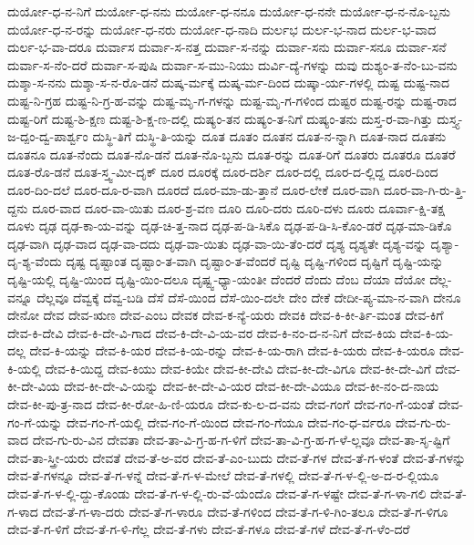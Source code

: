 {ದುರ್ಯೋ-ಧ-ನ-ನಿಗೆ
ದುರ್ಯೋ-ಧ-ನನು
ದುರ್ಯೋ-ಧ-ನನೂ
ದುರ್ಯೋ-ಧ-ನನೇ
ದುರ್ಯೋ-ಧ-ನ-ನೊ-ಬ್ಬನು
ದುರ್ಯೋ-ಧ-ನ-ರನ್ನು
ದುರ್ಯೋ-ಧ-ನರು
ದುರ್ಯೋ-ಧ-ನಾದಿ
ದುರ್ಲಭ
ದುರ್ಲ-ಭ-ನಾದ
ದುರ್ಲ-ಭ-ವಾದ
ದುರ್ಲ-ಭ-ವಾ-ದರೂ
ದುರ್ವಾಸ
ದುರ್ವಾ-ಸ-ನತ್ತ
ದುರ್ವಾ-ಸ-ನನ್ನು
ದುರ್ವಾ-ಸನು
ದುರ್ವಾ-ಸನೂ
ದುರ್ವಾ-ಸನೆ
ದುರ್ವಾ-ಸ-ನೆಂ-ದರೆ
ದುರ್ವಾ-ಸ-ಪುಷಿ
ದುರ್ವಾ-ಸ-ಮು-ನಿಯು
ದುರ್ವಿ-ದ್ಯೆ-ಗಳನ್ನು
ದುವು
ದುಶ್ಯಂ-ತ-ನೆಂ-ಬು-ವನು
ದುಶ್ಶಾ-ಸ-ನನು
ದುಶ್ಶಾ-ಸ-ನ-ರೊ-ಡನೆ
ದುಷ್ಕ-ರ್ಮಕ್ಕೆ
ದುಷ್ಕ-ರ್ಮ-ದಿಂದ
ದುಷ್ಕಾ-ರ್ಯ-ಗಳಲ್ಲಿ
ದುಷ್ಟ
ದುಷ್ಟ-ನಾದ
ದುಷ್ಟ-ನಿ-ಗ್ರಹ
ದುಷ್ಟ-ನಿ-ಗ್ರ-ಹ-ವನ್ನು
ದುಷ್ಟ-ಮೃ-ಗ-ಗಳನ್ನು
ದುಷ್ಟ-ಮೃ-ಗ-ಗಳಿಂದ
ದುಷ್ಟರ
ದುಷ್ಟ-ರನ್ನು
ದುಷ್ಟ-ರಾದ
ದುಷ್ಟ-ರಿಗೆ
ದುಷ್ಟ-ಶಿ-ಕ್ಷಣ
ದುಷ್ಟ-ಶಿ-ಕ್ಷ-ಣ-ದಲ್ಲಿ
ದುಷ್ಯಂ-ತನ
ದುಷ್ಯಂ-ತ-ನಿಗೆ
ದುಷ್ಯಂ-ತನು
ದುಸ್ತ-ರ-ವಾ-ಗಿತ್ತು
ದುಸ್ತ್ಯ-ಜ-ದ್ಪಂ-ದ್ವ-ಪಾರ್ಶ್ವಂ
ದುಸ್ಥಿ-ತಿಗೆ
ದುಸ್ಥಿ-ತಿ-ಯನ್ನು
ದೂತ
ದೂತಂ
ದೂತನ
ದೂತ-ನ-ನ್ನಾಗಿ
ದೂತ-ನಾದ
ದೂತನು
ದೂತನೂ
ದೂತ-ನೆಂದು
ದೂತ-ನೊ-ಡನೆ
ದೂತ-ನೊ-ಬ್ಬನು
ದೂತ-ರನ್ನು
ದೂತ-ರಿಗೆ
ದೂತರು
ದೂತರೂ
ದೂತರೆ
ದೂತ-ರೊ-ಡನೆ
ದೂತ-ಸ್ತ್ವ-ಮೀ-ದೃಕ್
ದೂರ
ದೂರಕ್ಕೆ
ದೂರ-ದರ್ಶಿ
ದೂರ-ದಲ್ಲಿ
ದೂರ-ದ-ಲ್ಲಿದ್ದ
ದೂರ-ದಿಂದ
ದೂರ-ದಿಂ-ದಲೆ
ದೂರ-ದೂ-ರ-ವಾಗಿ
ದೂರದೆ
ದೂರ-ಮಾ-ಡು-ತ್ತಾನೆ
ದೂರ-ಲೇಕೆ
ದೂರ-ವಾಗಿ
ದೂರ-ವಾ-ಗಿ-ರು-ತ್ತಿ-ದ್ದನು
ದೂರ-ವಾದ
ದೂರ-ವಾ-ಯಿತು
ದೂರ-ಶ್ರ-ವಣ
ದೂರಿ
ದೂರಿ-ದರು
ದೂರಿ-ದಳು
ದೂರು
ದೂರ್ವಾ-ಕ್ಷಿ-ತಕ್ಷ
ದೂಳು
ದೃಢ
ದೃಢ-ಕಾ-ಯ-ವನ್ನು
ದೃಢ-ಚಿ-ತ್ತ-ನಾದ
ದೃಢ-ಪ-ಡಿ-ಸಿಕೊ
ದೃಢ-ಪ-ಡಿ-ಸಿ-ಕೊಂ-ಡರೆ
ದೃಢ-ಮಾ-ಡಿಕೊ
ದೃಢ-ವಾಗಿ
ದೃಢ-ವಾದ
ದೃಢ-ವಾ-ದದು
ದೃಢ-ವಾ-ಯಿತು
ದೃಢ-ವಾ-ಯಿ-ತೆಂ-ದರೆ
ದೃಶ್ಯ
ದೃಶ್ಯತೇ
ದೃಶ್ಯ-ವನ್ನು
ದೃಶ್ಯಾ-ದೃ-ಶ್ಯ-ವೆಂದು
ದೃಷ್ಟ
ದೃಷ್ಟಾಂತ
ದೃಷ್ಟಾಂ-ತ-ವಾಗಿ
ದೃಷ್ಟಾಂ-ತ-ವೆಂದರೆ
ದೃಷ್ಟಿ
ದೃಷ್ಟಿ-ಗಳಿಂದ
ದೃಷ್ಟಿಗೆ
ದೃಷ್ಟಿ-ಯನ್ನು
ದೃಷ್ಟಿ-ಯಲ್ಲಿ
ದೃಷ್ಟಿ-ಯಿಂದ
ದೃಷ್ಟಿ-ಯಿಂ-ದಲೂ
ದೃಷ್ಟ್ವ-ಧ್ಯಾ-ಯಂತೀ
ದೆಂದರೆ
ದೆಂದು
ದೆಂಬ
ದೆಯಾ
ದೆಯೋ
ದೆಲ್ಲ-ವನ್ನೂ
ದೆಲ್ಲವೂ
ದೆವ್ವಕ್ಕೆ
ದೆವ್ವ-ಬಡಿ
ದೆಸೆ
ದೆಸೆ-ಯಿಂದ
ದೆಸೆ-ಯಿಂ-ದಲೇ
ದೇಂ
ದೇಕೆ
ದೇದೀ-ಪ್ಯ-ಮಾ-ನ-ವಾಗಿ
ದೇನೂ
ದೇನೋ
ದೇವ
ದೇವ-ಋಣ
ದೇವ-ಎಂಬ
ದೇವಕ
ದೇವ-ಕ-ನ್ಯೆ-ಯರು
ದೇವಕಿ
ದೇವ-ಕಿ-ಕೀ-ರ್ತಿ-ಮಂತ
ದೇವ-ಕಿಗೆ
ದೇವ-ಕಿ-ದೇವಿ
ದೇವ-ಕಿ-ದೇ-ವಿ-ಗಾದ
ದೇವ-ಕಿ-ದೇ-ವಿ-ಯ-ವರ
ದೇವ-ಕಿ-ನಂ-ದ-ನ-ನಿಗೆ
ದೇವ-ಕಿಯ
ದೇವ-ಕಿ-ಯ-ದಲ್ಲ
ದೇವ-ಕಿ-ಯನ್ನು
ದೇವ-ಕಿ-ಯರ
ದೇವ-ಕಿ-ಯ-ರನ್ನು
ದೇವ-ಕಿ-ಯ-ರಾಗಿ
ದೇವ-ಕಿ-ಯರು
ದೇವ-ಕಿ-ಯರೂ
ದೇವ-ಕಿ-ಯಲ್ಲಿ
ದೇವ-ಕಿ-ಯಿದ್ದ
ದೇವ-ಕಿಯು
ದೇವ-ಕಿಯೇ
ದೇವ-ಕೀ-ದೇವಿ
ದೇವ-ಕೀ-ದೇ-ವಿಗೂ
ದೇವ-ಕೀ-ದೇ-ವಿಗೆ
ದೇವ-ಕೀ-ದೇ-ವಿಯ
ದೇವ-ಕೀ-ದೇ-ವಿ-ಯನ್ನು
ದೇವ-ಕೀ-ದೇ-ವಿ-ಯರ
ದೇವ-ಕೀ-ದೇ-ವಿಯೂ
ದೇವ-ಕೀ-ನಂ-ದ-ನಾಯ
ದೇವ-ಕೀ-ಪು-ತ್ರ-ನಾದ
ದೇವ-ಕೀ-ರೋ-ಹಿ-ಣಿ-ಯರೂ
ದೇವ-ಕು-ಲ-ದ-ವನು
ದೇವ-ಗಂಗೆ
ದೇವ-ಗಂ-ಗೆ-ಯಂತೆ
ದೇವ-ಗಂ-ಗೆ-ಯನ್ನು
ದೇವ-ಗಂ-ಗೆ-ಯಲ್ಲಿ
ದೇವ-ಗಂ-ಗೆ-ಯಿಂದ
ದೇವ-ಗಂ-ಗೆಯೂ
ದೇವ-ಗಂ-ಧ-ರ್ವರೂ
ದೇವ-ಗು-ರು-ವಾದ
ದೇವ-ಗು-ರು-ವಿನ
ದೇವತಾ
ದೇವ-ತಾ-ವಿ-ಗ್ರ-ಹ-ಗ-ಳಿಗೆ
ದೇವ-ತಾ-ವಿ-ಗ್ರ-ಹ-ಗ-ಳೆ-ಲ್ಲವೂ
ದೇವ-ತಾ-ಸೃ-ಷ್ಟಿಗೆ
ದೇವ-ತಾ-ಸ್ತ್ರೀ-ಯರು
ದೇವತೆ
ದೇವ-ತೆ-ಅ-ವರ
ದೇವ-ತೆ-ಎಂ-ಬುದು
ದೇವ-ತೆ-ಗಳ
ದೇವ-ತೆ-ಗ-ಳಂತೆ
ದೇವ-ತೆ-ಗಳನ್ನು
ದೇವ-ತೆ-ಗಳನ್ನೂ
ದೇವ-ತೆ-ಗ-ಳನ್ನೆ
ದೇವ-ತೆ-ಗ-ಳ-ಮೇಲೆ
ದೇವ-ತೆ-ಗಳಲ್ಲಿ
ದೇವ-ತೆ-ಗ-ಳ-ಲ್ಲಿ-ಅ-ದ-ರ-ಲ್ಲಿಯೂ
ದೇವ-ತೆ-ಗ-ಳ-ಲ್ಲಿ-ದ್ದು-ಕೊಂಡು
ದೇವ-ತೆ-ಗ-ಳ-ಲ್ಲಿ-ರು-ವೆ-ಯೆಂದೊ
ದೇವ-ತೆ-ಗ-ಳಷ್ಟೇ
ದೇವ-ತೆ-ಗ-ಳಾ-ಗಲಿ
ದೇವ-ತೆ-ಗ-ಳಾದ
ದೇವ-ತೆ-ಗ-ಳಾ-ದರು
ದೇವ-ತೆ-ಗ-ಳಾರೂ
ದೇವ-ತೆ-ಗಳಿಂದ
ದೇವ-ತೆ-ಗ-ಳಿ-ಗಿಂ-ತಲೂ
ದೇವ-ತೆ-ಗ-ಳಿಗೂ
ದೇವ-ತೆ-ಗ-ಳಿಗೆ
ದೇವ-ತೆ-ಗ-ಳಿ-ಗೆಲ್ಲ
ದೇವ-ತೆ-ಗಳು
ದೇವ-ತೆ-ಗಳೂ
ದೇವ-ತೆ-ಗಳೆ
ದೇವ-ತೆ-ಗ-ಳೆಂ-ದರೆ
}
